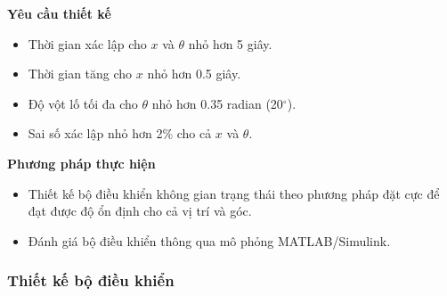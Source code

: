 \documentclass[12pt,a4paper]{article}
\begin{document}
\vspace{\baselineskip}

\begin{minipage}[t]{0.3\linewidth}
    \textbf{Yêu cầu thiết kế}
\end{minipage}\begin{minipage}[t]{0.6\linewidth}
    \begin{itemize}[noitemsep,topsep=0pt]
        \item Thời gian xác lập cho $x$ và $\theta$ nhỏ hơn 5 giây.
        \item Thời gian tăng cho $x$ nhỏ hơn 0.5 giây. 
        \item Độ vột lố tối đa cho $\theta$ nhỏ hơn 0.35 radian (20$^\circ$). 
        \item Sai số xác lập nhỏ hơn 2\% cho cả $x$ và $\theta$. 
    \end{itemize}
\end{minipage}

\vspace{\baselineskip}

\begin{minipage}[t]{0.3\linewidth}
    \textbf{Phương pháp thực hiện}
\end{minipage}\begin{minipage}[t]{0.6\linewidth}
    \begin{itemize}[noitemsep,topsep=0pt]
        \item Thiết kế bộ điều khiển không gian trạng thái theo phương pháp đặt cực để đạt được độ ổn định cho cả vị trí và góc. 
        \item Đánh giá bộ điều khiển thông qua mô phỏng MATLAB/Simulink. 
    \end{itemize}
\end{minipage}


\subsubsection{Thiết kế bộ điều khiển}
\end{document}
